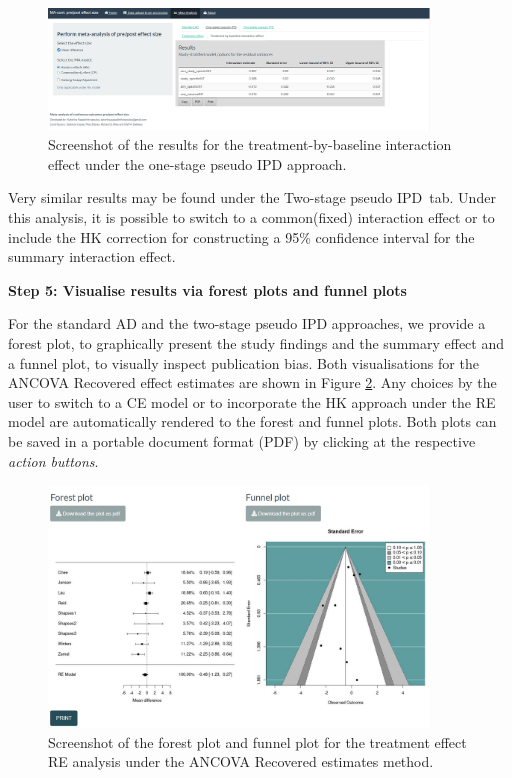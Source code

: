 \documentclass[AMA,STIX1COL]{WileyNJD-v2}
\begin{document}
\begin{figure} [t] 
  \centering \includegraphics[width=0.9\textwidth]{One_stage_int_effect_shiny.jpeg}
    \caption{\small {Screenshot of the results for the treatment-by-baseline interaction effect under the one-stage pseudo IPD approach.}} \label{fig:shiny-one-int}
\end{figure}

Very similar results may be found under the \textquotesingle Two-stage pseudo IPD\textquotesingle\ tab. Under this analysis, it is possible to switch to a common(fixed) interaction effect or to include the HK correction for constructing a 95\% confidence interval for the summary interaction effect.

\newpage
\vspace{0.1cm}
\textbf{Step 5: Visualise results via forest plots and funnel plots}
\vspace{0.1cm}

For the standard AD and the two-stage pseudo IPD approaches, we provide a forest plot, to graphically present the study findings and the summary effect and a funnel plot, to visually inspect publication bias. Both visualisations for the ANCOVA Recovered effect estimates are shown in Figure \ref{fig:shiny-forest_funnel}. Any choices by the user to switch to a CE model or to incorporate the HK approach under the RE model are automatically rendered to the forest and funnel plots. Both plots can be saved in a portable document format (PDF) by clicking at the respective \textit{action buttons}.

\begin{figure} [t]
  \centering \includegraphics[width=0.9\textwidth]{forest_funnel.JPG}
    \caption{\small {Screenshot of the forest plot and funnel plot for the treatment effect RE analysis under the ANCOVA Recovered estimates method.}} \label{fig:shiny-forest_funnel}
\end{figure}
\end{document}
